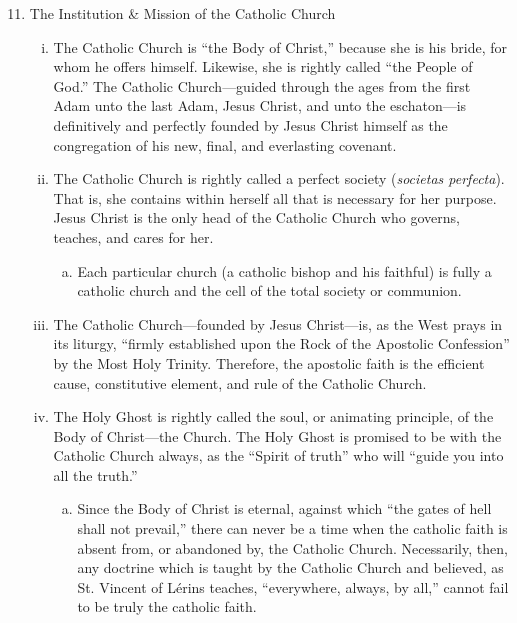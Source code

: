 \begin{enumerate}
\setcounter{enumi}{10}
	\item The Institution \& Mission of the Catholic Church
	\begin{enumerate}[i.]
		\item The Catholic Church is ``the Body of Christ,'' because she is his bride, for whom he offers himself. Likewise, she is rightly called ``the People of God.'' The Catholic Church---guided through the ages from the first Adam unto the last Adam, Jesus Christ, and unto the eschaton---is definitively and perfectly founded by Jesus Christ himself as the congregation of his new, final, and everlasting covenant.
		\item The Catholic Church is rightly called a perfect society (\textit{societas perfecta}). That is, she contains within herself all that is necessary for her purpose. Jesus Christ is the only head of the Catholic Church who governs, teaches, and cares for her.
			\begin{enumerate}[a.]
				\item Each particular church (a catholic bishop and his faithful) is fully a catholic church and the cell of the total society or communion.
			\end{enumerate}
		\item The Catholic Church---founded by Jesus Christ---is, as the West prays in its liturgy, ``firmly established upon the Rock of the Apostolic Confession'' by the Most Holy Trinity. Therefore, the apostolic faith is the efficient cause, constitutive element, and rule of the Catholic Church.
		\item The Holy Ghost is rightly called the soul, or animating principle, of the Body of Christ---the Church. The Holy Ghost is promised to be with the Catholic Church always, as the ``Spirit of truth'' who will ``guide you into all the truth.''
		\begin{enumerate}[a.]
			\item Since the Body of Christ is eternal, against which ``the gates of hell shall not prevail,'' there can never be a time when the catholic faith is absent from, or abandoned by, the Catholic Church. Necessarily, then, any doctrine which is taught by the Catholic Church and believed, as St. Vincent of Lérins teaches, ``everywhere, always, by all,'' cannot fail to be truly the catholic faith.

\end{enumerate}
\end{enumerate}
\end{enumerate}
